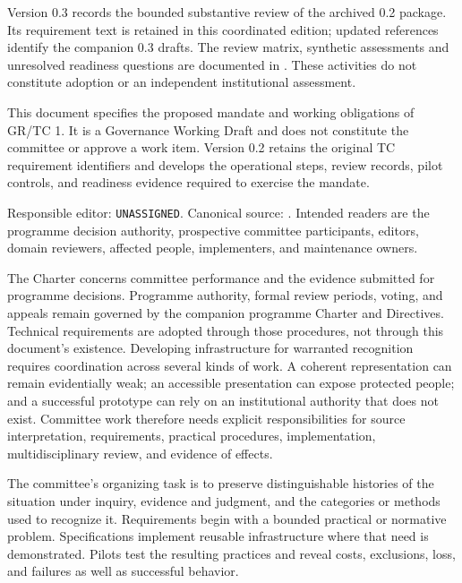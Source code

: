 \documentclass[11pt,a4paper]{article}
\begin{document}
\GSPfrontmatter
{}
Version 0.3 records the bounded substantive review of the archived 0.2 package. Its requirement text is retained in this coordinated edition; updated references identify the companion 0.3 drafts. The review matrix, synthetic assessments and unresolved readiness questions are documented in . These activities do not constitute adoption or an independent institutional assessment.

This document specifies the proposed mandate and working obligations of GR/TC 1. It is a Governance Working Draft and does not constitute the committee or approve a work item. Version 0.2 retains the original TC requirement identifiers and develops the operational steps, review records, pilot controls, and readiness evidence required to exercise the mandate.

Responsible editor: \texttt{UNASSIGNED}. Canonical source: . Intended readers are the programme decision authority, prospective committee participants, editors, domain reviewers, affected people, implementers, and maintenance owners.

The Charter concerns committee performance and the evidence submitted for programme decisions. Programme authority, formal review periods, voting, and appeals remain governed by the companion programme Charter and Directives. Technical requirements are adopted through those procedures, not through this document's existence.
\tableofcontents
\clearpage
{}
Developing infrastructure for warranted recognition requires coordination across several kinds of work. A coherent representation can remain evidentially weak; an accessible presentation can expose protected people; and a successful prototype can rely on an institutional authority that does not exist. Committee work therefore needs explicit responsibilities for source interpretation, requirements, practical procedures, implementation, multidisciplinary review, and evidence of effects.

The committee's organizing task is to preserve distinguishable histories of the situation under inquiry, evidence and judgment, and the categories or methods used to recognize it. Requirements begin with a bounded practical or normative problem. Specifications implement reusable infrastructure where that need is demonstrated. Pilots test the resulting practices and reveal costs, exclusions, loss, and failures as well as successful behavior.
\end{document}
